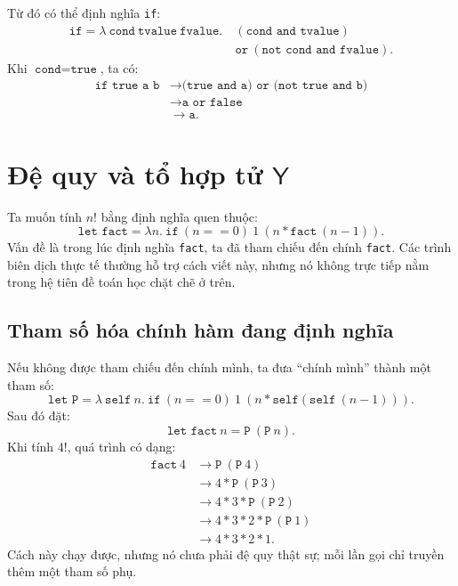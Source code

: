 \documentclass[11pt]{article}
\newcommand{\Ycomb}{\mathsf{Y}}
\begin{document}
Từ đó có thể định nghĩa \texttt{if}:
\[
\begin{aligned}
\texttt{if} = \lambda\ \texttt{cond}\ \texttt{tvalue}\ \texttt{fvalue}.\
  &(\texttt{cond and tvalue})\\
  &\texttt{or}\ (\texttt{not cond and fvalue}).
\end{aligned}
\]
Khi \(\texttt{cond}=\texttt{true}\), ta có:
\[
\begin{aligned}
\texttt{if true a b}
&\rightarrow \texttt{(true and a) or (not true and b)}\\
&\rightarrow \texttt{a or false}\\
&\rightarrow \texttt{a}.
\end{aligned}
\]

\section{Đệ quy và tổ hợp tử \texorpdfstring{\(\Ycomb\)}{Y}}

Ta muốn tính \(n!\) bằng định nghĩa quen thuộc:
\[
  \texttt{let fact} =
  \lambda n.\ \texttt{if}\ (n==0)\ 1\ (n*\texttt{fact}\ (n-1)).
\]
Vấn đề là trong lúc định nghĩa \texttt{fact}, ta đã tham chiếu đến chính
\texttt{fact}. Các trình biên dịch thực tế thường hỗ trợ cách viết này, nhưng
nó không trực tiếp nằm trong hệ tiên đề toán học chặt chẽ ở trên.

\subsection{Tham số hóa chính hàm đang định nghĩa}

Nếu không được tham chiếu đến chính mình, ta đưa ``chính mình'' thành một tham
số:
\[
  \texttt{let P} =
  \lambda\ \texttt{self}\ n.\
  \texttt{if}\ (n==0)\ 1\ (n * \texttt{self}(\texttt{self}\ (n-1))).
\]
Sau đó đặt:
\[
  \texttt{let fact}\ n = \texttt{P}\ (\texttt{P}\ n).
\]
Khi tính \(4!\), quá trình có dạng:
\[
\begin{aligned}
\texttt{fact}\ 4
&\rightarrow \texttt{P}\ (\texttt{P}\ 4)\\
&\rightarrow 4 * \texttt{P}\ (\texttt{P}\ 3)\\
&\rightarrow 4 * 3 * \texttt{P}\ (\texttt{P}\ 2)\\
&\rightarrow 4 * 3 * 2 * \texttt{P}\ (\texttt{P}\ 1)\\
&\rightarrow 4 * 3 * 2 * 1.
\end{aligned}
\]
Cách này chạy được, nhưng nó chưa phải đệ quy thật sự; mỗi lần gọi chỉ truyền
thêm một tham số phụ.
\end{document}
